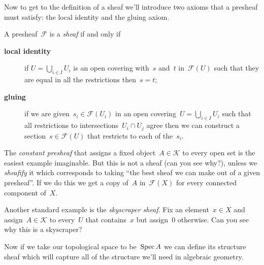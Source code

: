 Now to get to the definition of a sheaf we'll introduce two axioms that a presheaf must satisfy: the local identity and the gluing axiom.

\begin{definition}
  A presheaf~$\mathcal{F}$ is a \emph{sheaf} if and only if
  \begin{description}
    \item[\textbf{local identity}] if $U=\bigcup_{i\in I}U_i$ is an open covering with~$s$ and~$t$ in~$\mathcal{F}(U)$ such that they are equal in all the restrictions then~$s=t$;
    \item[\textbf{gluing}] if we are given~$s_i\in\mathcal{F}(U_i)$ in an open covering~$U=\bigcup_{i\in I}U_i$ such that all restrictions to intersections~$U_i\cap U_j$ agree then we can construct a section~$s\in\mathcal{F}(U)$ that restricts to each of the~$s_i$.
  \end{description}
\end{definition}

\begin{example}
  The \emph{constant presheaf} that assigns a fixed object~$A\in\mathcal{K}$ to every open set is the easiest example imaginable. But this is not a sheaf (can you see why?), unless we \emph{sheafify} it which corresponds to taking ``the best sheaf we can make out of a given presheaf''. If we do this we get a copy of~$A$ in~$\mathcal{F}(X)$ for every connected component of~$X$.
\end{example}

\begin{example}
  Another standard example is the \emph{skyscraper sheaf}. Fix an element~$x\in X$ and assign~$A\in\mathcal{K}$ to every~$U$ that contains~$x$ but assign~$0$ otherwise. Can you see why this is a skyscraper?
\end{example}

Now if we take our topological space to be~$\operatorname{Spec} A$ we can define its structure sheaf which will capture all of the structure we'll need in algebraic geometry.
